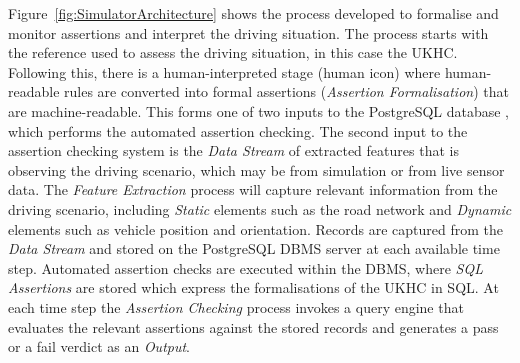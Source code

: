 Figure~\ref{fig:SimulatorArchitecture} shows the process developed to formalise and monitor assertions and interpret the driving situation. The process starts with the reference used to assess the driving situation, in this case the UKHC. Following this, there is a human-interpreted stage (human icon) where human-readable rules are converted into formal assertions (\emph{Assertion Formalisation}) that are machine-readable. This forms one of two inputs to the %
PostgreSQL database %
, which performs
the automated assertion checking. The second input to the %
assertion checking system
is the \emph{Data Stream} of extracted features that is observing the driving scenario, which may be from simulation or from live sensor data. The \emph{Feature Extraction} process will capture relevant information from the driving scenario, including \emph{Static} elements such as the road network and \emph{Dynamic} elements such as vehicle position and orientation. Records are captured from the \emph{Data Stream} and stored on the PostgreSQL DBMS server at each available time step.
%
Automated assertion checks are executed within the DBMS, where \emph{SQL Assertions} are stored which express the formalisations of the UKHC in SQL. At each time step the \emph{Assertion Checking} process invokes a query engine that evaluates the relevant assertions against the stored records and generates a pass or a fail verdict as an \emph{Output}.



